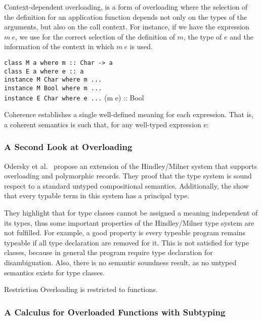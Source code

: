 \documentclass[hidelinks, twocolumn]{article}
\begin{document}
Context-dependent overloading, is a form of overloading where the selection of the definition for an application function depends not only on the types of the arguments, but also on the call context. For instance,  if we have the  expression $m \ e$, we use for the correct selection of the definition of $m$, the type of $e$ and the information of the context in which  $m \ e$ is used.

\texttt{class M a where m :: Char -> a\\
class E a where e :: a\\
instance M Char where m ...\\
instance M Bool where m ...\\
instance E Char where e ...}
(m e) :: Bool


Coherence establishes a single well-defined meaning for each expression. That is, a coherent semantics is such that, for any well-typed expression e:


\subsubsection{A Second Look at Overloading}
Odersky et al.~\cite{Odersky1995} propose an extension of the Hindley/Milner system that supports overloading and polymorphic records. They proof that the type system is sound respect to a standard untyped compositional semantics. Additionally, the show  that every typable term in this system has a principal type.

They highlight that for type classes cannot be assigned a meaning independent of its types, thus some important properties of the Hindley/Milner type system are not fulfilled. For example, a good property is  every typeable program remains typeable if all type declaration are removed for it. This is not satisfied for type classes, because in general the program require type declaration for disambiguation. Also, there is no semantic soundness result, as no untyped semantics exists for type classes.

Restriction 
Overloading is restricted to functions.

\subsubsection{A Calculus for Overloaded Functions with Subtyping}
\end{document}
